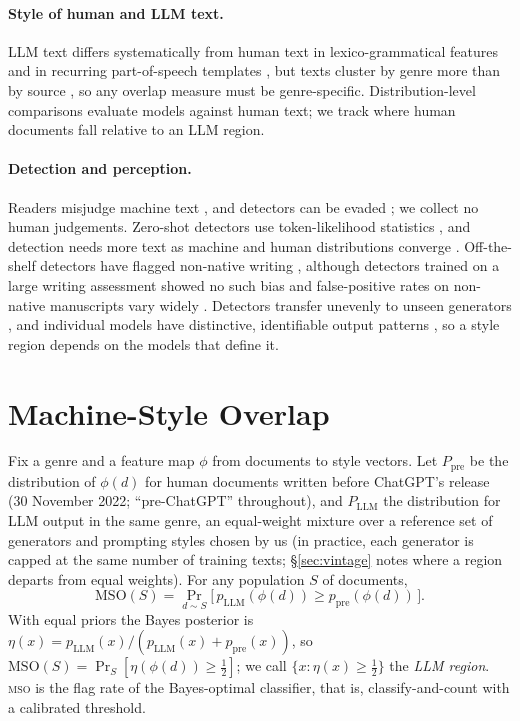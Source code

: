 \documentclass[11pt]{article}
\newcommand{\mso}{\textsc{mso}}
\begin{document}
\paragraph{Style of human and LLM text.}
LLM text differs systematically from human text in lexico-grammatical features \citep{reinhart2025,
munozortiz2024, berbersardinha2024, herbold2023} and in recurring part-of-speech templates \citep{shaib2024},
but texts cluster by genre more than by source \citep{rallapalli2026}, so any overlap measure must be
genre-specific. Distribution-level comparisons \citep{pillutla2021, yang2026coverage} evaluate models against
human text; we track where human documents fall relative to an LLM region.

\paragraph{Detection and perception.}
Readers misjudge machine text \citep{clark2021, jakesch2023, casal2023, gao2023}, and detectors can be evaded \citep{sadasivan2025, krishna2023, dugan2024raid}; we collect no human judgements. Zero-shot detectors use
token-likelihood statistics \citep{hans2024binoculars, bao2024fastdetectgpt}, and detection needs more text as machine
and human distributions converge \citep{chakraborty2024}. Off-the-shelf detectors have flagged non-native writing
\citep{liang2023detectors}, although detectors trained on a large writing assessment showed no such bias \citep{jiang2024} and false-positive
rates on non-native manuscripts vary widely \citep{park2026}. Detectors transfer unevenly to unseen generators
\citep{pu2023zeroshot, li2024mage}, and individual models have distinctive, identifiable output patterns
\citep{sun2025idiosyncrasies}, so a style region depends on the models that define it.

\section{Machine-Style Overlap}
\label{sec:mso}

Fix a genre and a feature map $\phi$ from documents to style vectors. Let $P_{\text{pre}}$ be the distribution of
$\phi(d)$ for human documents written before ChatGPT's release (30 November 2022; ``pre-ChatGPT'' throughout),
and $P_{\text{LLM}}$ the distribution for LLM output in the same genre, an equal-weight mixture over a reference
set of generators and prompting styles chosen by us (in practice, each generator is capped at the same number of
training texts; \S\ref{sec:vintage} notes where a region departs from equal weights). For any population $S$ of documents,
\begin{equation}
\mathrm{MSO}(S) = \Pr_{d\sim S}\big[\, p_{\text{LLM}}(\phi(d)) \ge p_{\text{pre}}(\phi(d)) \,\big].
\end{equation}
With equal priors the Bayes posterior is $\eta(x) = p_{\text{LLM}}(x)/(p_{\text{LLM}}(x)+p_{\text{pre}}(x))$, so
$\mathrm{MSO}(S) = \Pr_S[\eta(\phi(d)) \ge \tfrac12]$; we call $\{x: \eta(x) \ge \tfrac12\}$ the \emph{LLM
region}. \mso{} is the flag rate of the Bayes-optimal classifier, that is, classify-and-count
\citep{forman2008} with a calibrated threshold.
\end{document}
